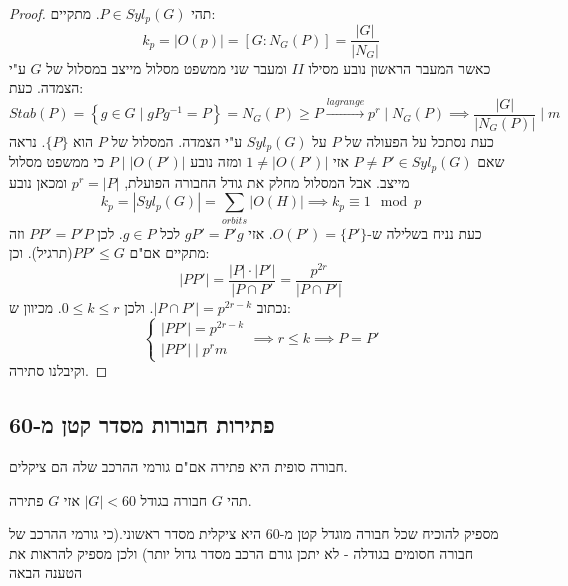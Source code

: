 \documentclass{tstextbook}
\begin{document}
\begin{proof}
תהי \(P \in Syl_{p}(G)\). מתקיים:
$$k_{p}=|O(p)|=[G:N_{G}(P)]=\frac{|G|}{|N_{G}|}$$
כאשר המעבר הראשון נובע מסילו \(II\) ומעבר שני ממשפט מסלול מייצב במסלול של \(G\) ע"י הצמדה. כעת:
$$Stab(P)=\left\{  g\in G\mid gPg^{-1} =P  \right\}=N_{G}(P)\geq P\xrightarrow{lagrange} p^r \mid N_{G}(P)\implies \frac{|G|}{|N_{G}(P)|}\mid m$$
כעת נסתכל על הפעולה של \(P\) על \(Syl_{p}(G)\) ע"י הצמדה. המסלול של \(P\) הוא \(\{ P \}\). נראה שאם \(P\neq P'\in Syl_{p}(G)\) אזי \(1\neq|O(P')|\) ומזה נובע \(P\mid|O(P')|\) כי ממשפט מסלול מייצב. אבל המסלול מחלק את גודל החבורה הפועלת, \(p^r=|P|\) ומכאן נובע
$$k_{p}=|Syl_{p}(G)|=\sum_{orbits}|O(H)|\implies k_{p}\equiv 1\mod p$$
כעת נניח בשלילה ש-\(O(P')=\{ P' \}\). אזי \(gP'=P'g\) לכל \(g \in P\). לכן \(PP'=P'P\) וזה מתקיים אם"ם \(PP'\leq G\)(תרגיל). וכן:
$$|PP'|=\frac{|P|\cdot |P'|}{|P\cap P'}=\frac{p^{2r}}{|P\cap P'|}$$
נכתוב \(|P\cap P'|=p^{2r-k}\). ולכן \(0\leq k\leq r\). מכיוון ש:
$$\begin{cases}|PP'|=p^{2r-k} \\|PP'|\mid p^r m
\end{cases}\implies r\leq k\implies P=P'$$
וקיבלנו סתירה.

\end{proof}
\subsection{פתירות חבורות מסדר קטן מ-60}

\begin{reminder}
חבורה סופית היא פתירה אם"ם גורמי ההרכב שלה הם ציקלים.

\end{reminder}
\begin{proposition}
תהי \(G\) חבורה בגודל \(|G|<60\) אזי \(G\) פתירה.

\end{proposition}
מספיק להוכיח שכל חבורה מוגדל קטן מ-\(60\) היא ציקלית מסדר ראשוני.(כי גורמי ההרכב של חבורה חסומים בגודלה - לא יתכן גורם הרכב מסדר גדול יותר) ולכן מספיק להראות את הטענה הבאה
\end{document}
